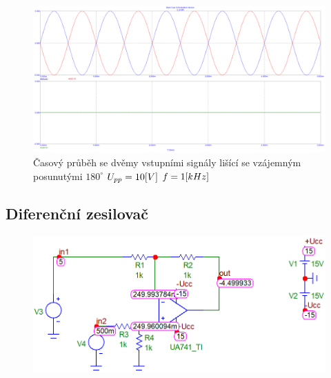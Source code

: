\documentclass{article}
\begin{document}
\begin{figure}[H]
  \begin{minipage}[t]{\textwidth}
    \centering
    \includegraphics[width=\textwidth]{PC/ukol2/nula_vzstup.png}
    Časový průběh se dvěmy vstupními signály lišící se vzájemným posunutými \(180^\circ\) \(U_{pp} = 10\-[V]\) \(f = 1\-[kHz]\)
  \end{minipage}
\end{figure}

\subsection*{Diferenční zesilovač}
\begin{figure}[H]
  \begin{minipage}[t]{\textwidth}
    \includegraphics[width=\textwidth]{PC/ukol3/DC.png}
  \end{minipage}
\end{figure}
\end{document}
